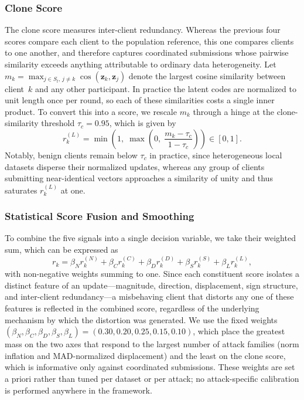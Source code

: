 \documentclass[journal]{IEEEtran}
\begin{document}
\subsubsection{Clone Score}
The clone score measures inter-client redundancy. Whereas the previous four scores compare each client to the population reference, this one compares clients to one another, and therefore captures coordinated submissions whose pairwise similarity exceeds anything attributable to ordinary data heterogeneity. Let $m_k = \max_{j \in S_t,\, j \neq k} \cos(\mathbf{z}_k, \mathbf{z}_j)$ denote the largest cosine similarity between client~$k$ and any other participant. In practice the latent codes are normalized to unit length once per round, so each of these similarities costs a single inner product. To convert this into a score, we rescale $m_k$ through a hinge at the clone-similarity threshold $\tau_c = 0.95$, which is given by
\begin{equation}
r_k^{(L)} = \min\!\left(1,\; \max\!\left(0,\; \frac{m_k - \tau_c}{1 - \tau_c}\right)\right) \in [0,1].
\label{eq:clone_score}
\end{equation}
Notably, benign clients remain below $\tau_c$ in practice, since heterogeneous local datasets disperse their normalized updates, whereas any group of clients submitting near-identical vectors approaches a similarity of unity and thus saturates $r_k^{(L)}$ at one.

\subsubsection{Statistical Score Fusion and Smoothing}
To combine the five signals into a single decision variable, we take their weighted sum, which can be expressed as
\begin{equation}
r_k = \beta_N r_k^{(N)} + \beta_C r_k^{(C)} + \beta_D r_k^{(D)} + \beta_S r_k^{(S)} + \beta_L r_k^{(L)},
\label{eq:stat_score}
\end{equation}
with non-negative weights summing to one. Since each constituent score isolates a distinct feature of an update---magnitude, direction, displacement, sign structure, and inter-client redundancy---a misbehaving client that distorts any one of these features is reflected in the combined score, regardless of the underlying mechanism by which the distortion was generated. We use the fixed weights $(\beta_N, \beta_C, \beta_D, \beta_S, \beta_L) = (0.30, 0.20, 0.25, 0.15, 0.10)$, which place the greatest mass on the two axes that respond to the largest number of attack families (norm inflation and MAD-normalized displacement) and the least on the clone score, which is informative only against coordinated submissions. These weights are set a priori rather than tuned per dataset or per attack; no attack-specific calibration is performed anywhere in the framework.
\end{document}
